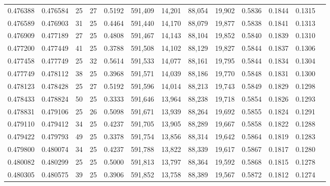 \begin{tabular}{rrrrrrrrrrrrr}
0.476388 & 0.476584 &    25 &  27 &                                     0.5192 & 591,409 &  14,201 &  88,054 &  19,902 & 0.5836 & 0.1844 & 0.1315 \\
0.476589 & 0.476903 &    31 &  25 &                                     0.4464 & 591,440 &  14,170 &  88,079 &  19,877 & 0.5838 & 0.1841 & 0.1313 \\
0.476909 & 0.477189 &    27 &  25 &                                     0.4808 & 591,467 &  14,143 &  88,104 &  19,852 & 0.5840 & 0.1839 & 0.1310 \\
0.477200 & 0.477449 &    41 &  25 &                                     0.3788 & 591,508 &  14,102 &  88,129 &  19,827 & 0.5844 & 0.1837 & 0.1306 \\
0.477458 & 0.477749 &    25 &  32 &                                     0.5614 & 591,533 &  14,077 &  88,161 &  19,795 & 0.5844 & 0.1834 & 0.1304 \\
0.477749 & 0.478112 &    38 &  25 &                                     0.3968 & 591,571 &  14,039 &  88,186 &  19,770 & 0.5848 & 0.1831 & 0.1300 \\
0.478123 & 0.478428 &    25 &  27 &                                     0.5192 & 591,596 &  14,014 &  88,213 &  19,743 & 0.5849 & 0.1829 & 0.1298 \\
0.478433 & 0.478824 &    50 &  25 &                                     0.3333 & 591,646 &  13,964 &  88,238 &  19,718 & 0.5854 & 0.1826 & 0.1293 \\
0.478831 & 0.479106 &    25 &  26 &                                     0.5098 & 591,671 &  13,939 &  88,264 &  19,692 & 0.5855 & 0.1824 & 0.1291 \\
0.479110 & 0.479412 &    34 &  25 &                                     0.4237 & 591,705 &  13,905 &  88,289 &  19,667 & 0.5858 & 0.1822 & 0.1288 \\
0.479422 & 0.479793 &    49 &  25 &                                     0.3378 & 591,754 &  13,856 &  88,314 &  19,642 & 0.5864 & 0.1819 & 0.1283 \\
0.479800 & 0.480074 &    34 &  25 &                                     0.4237 & 591,788 &  13,822 &  88,339 &  19,617 & 0.5867 & 0.1817 & 0.1280 \\
0.480082 & 0.480299 &    25 &  25 &                                     0.5000 & 591,813 &  13,797 &  88,364 &  19,592 & 0.5868 & 0.1815 & 0.1278 \\
0.480305 & 0.480575 &    39 &  25 &                                     0.3906 & 591,852 &  13,758 &  88,389 &  19,567 & 0.5872 & 0.1812 & 0.1274 \\

\end{tabular}
